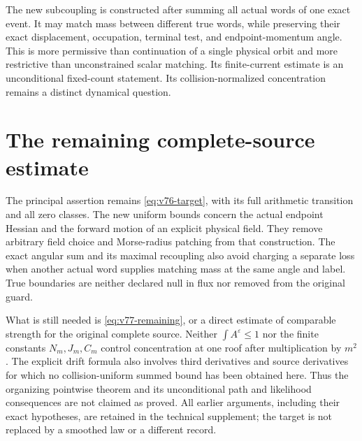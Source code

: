 \documentclass[11pt,reqno]{amsart}
\numberwithin{equation}{section}
\theoremstyle{definition}
\theoremstyle{remark}\newtheorem{remark}[theorem]{Remark}
\begin{document}
The new subcoupling is constructed after summing all actual words of
one exact event. It may match mass between different true words,
while preserving their exact displacement, occupation, terminal test,
and endpoint-momentum angle. This is more permissive than continuation
of a single physical orbit and more restrictive than unconstrained
scalar matching. Its finite-current estimate is an unconditional
fixed-count statement. Its collision-normalized concentration remains
a distinct dynamical question.





\section{The remaining complete-source estimate}
The principal assertion remains \eqref{eq:v76-target}, with its full
arithmetic transition and all zero classes. The new uniform bounds
concern the actual endpoint Hessian and the forward motion of an
explicit physical field. They remove arbitrary field choice and
Morse-radius patching from that construction. The exact angular
sum and its maximal recoupling also avoid charging a separate loss
when another actual word supplies matching mass at the same angle
and label. True boundaries are neither declared null in flux nor
removed from the original guard.

What is still needed is \eqref{eq:v77-remaining}, or a direct estimate
of comparable strength for the original complete source. Neither
$\int A^\varepsilon\le1$ nor the finite constants $N_m,J_m,C_m$
control concentration at one roof after multiplication by $m^2$.
The explicit drift formula also involves third derivatives and source
derivatives for which no collision-uniform summed bound has been
obtained here. Thus the organizing pointwise theorem and its
unconditional path and likelihood consequences are not claimed as
proved. All earlier arguments, including their exact hypotheses,
are retained in the technical supplement; the target is not replaced
by a smoothed law or a different record.


\end{document}
